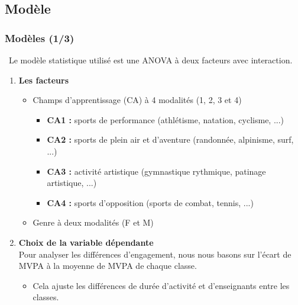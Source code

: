\documentclass{beamer}
\begin{document}
	\subsection{Modèle}
		\begin{frame}
			\frametitle{Modèles (1/3)} 
			\textcolor{sectioncolor}{\faExclamationTriangle \, Le modèle statistique utilisé est une ANOVA à deux facteurs avec interaction.}
			\pause
			\begin{enumerate}
				\item \textbf{Les facteurs}
				\vfill
				\begin{itemize}
					\item Champs d'apprentissage (CA) à 4 modalités (1, 2, 3 et 4)
					\vfill
					\pause
					\begin{itemize}
						\item \textbf{CA1 :} sports de performance (athlétisme, natation, cyclisme, ...)
						\vfill
						\item \textbf{CA2 :} sports de plein air et d'aventure (randonnée, alpinisme, surf, ...)
						\vfill
						\item \textbf{CA3 :} activité artistique (gymnastique rythmique, patinage artistique, ...)
						\vfill
						\item \textbf{CA4 :} sports d'opposition (sports de combat, tennis, ...)
					\end{itemize}
					\pause
					\item Genre à deux modalités (F et M)
				\end{itemize}
				\pause
				\item \textbf{Choix de la variable dépendante}\\
				Pour analyser les différences d'engagement, nous nous basons sur l'écart de MVPA à la moyenne de MVPA de chaque classe.
				\pause
				\begin{itemize}
					\item Cela ajuste les différences de durée d'activité et d'enseignants entre les classes.
				\end{itemize}
			\end{enumerate}
		\end{frame}
		
\end{document}
